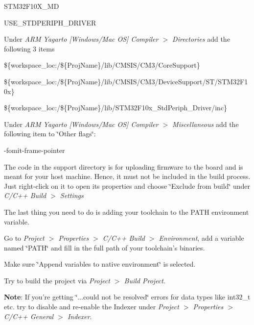 \begin{DoxyItemize}
\begin{DoxyItemize}
\begin{DoxyItemize}
\item S\+T\+M32\+F10\+X\+\_\+\+M\+D
\item U\+S\+E\+\_\+\+S\+T\+D\+P\+E\+R\+I\+P\+H\+\_\+\+D\+R\+I\+V\+E\+R
\end{DoxyItemize}
\item Under {\itshape A\+R\+M Yagarto \mbox{[}Windows/\+Mac O\+S\mbox{]} Compiler $>$ Directories} add the following 3 items
\begin{DoxyItemize}
\item \$\{workspace\+\_\+loc\+:/\$\{Proj\+Name\}/lib/\+C\+M\+S\+I\+S/\+C\+M3/\+Core\+Support\}
\item \$\{workspace\+\_\+loc\+:/\$\{Proj\+Name\}/lib/\+C\+M\+S\+I\+S/\+C\+M3/\+Device\+Support/\+S\+T/\+S\+T\+M32\+F10x\}
\item \$\{workspace\+\_\+loc\+:/\$\{Proj\+Name\}/lib/\+S\+T\+M32\+F10x\+\_\+\+Std\+Periph\+\_\+\+Driver/inc\}
\end{DoxyItemize}
\item Under {\itshape A\+R\+M Yagarto \mbox{[}Windows/\+Mac O\+S\mbox{]} Compiler $>$ Miscellaneous} add the following item to \char`\"{}\+Other flags\char`\"{}\+:
\begin{DoxyItemize}
\item -\/fomit-\/frame-\/pointer
\end{DoxyItemize}
\end{DoxyItemize}
\item The code in the support directory is for uploading firmware to the board and is meant for your host machine. Hence, it must not be included in the build process. Just right-\/click on it to open its properties and choose \char`\"{}\+Exclude from build\char`\"{} under {\itshape C/\+C++ Build $>$ Settings}
\item The last thing you need to do is adding your toolchain to the P\+A\+T\+H environment variable.
\begin{DoxyItemize}
\item Go to {\itshape Project $>$ Properties $>$ C/\+C++ Build $>$ Environment}, add a variable named \char`\"{}\+P\+A\+T\+H\char`\"{} and fill in the full path of your toolchain's binaries.
\item Make sure \char`\"{}\+Append variables to native environment\char`\"{} is selected.
\end{DoxyItemize}
\item Try to build the project via {\itshape Project $>$ Build Project}.
\item {\bfseries Note}\+: If you're getting \char`\"{}...\+could not be resolved\char`\"{} errors for data types like int32\+\_\+t etc. try to disable and re-\/enable the Indexer under {\itshape Project $>$ Properties $>$ C/\+C++ General $>$ Indexer}. 
\end{DoxyItemize}